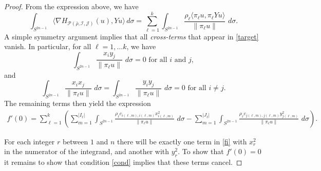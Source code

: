 \documentclass[12pt]{amsart}
\theoremstyle{definition}
\begin{document}
\begin{proof}
From the expression above, we have
\begin{equation}\label{target}
   \int_{S^{2n-1}} \langle \nabla H_{\mathcal{P}(\bar{\rho},\mathcal{I},\mathcal{J})}(u), Y u \rangle \, d\sigma = \sum_{\ell=1}^k \int_{S^{2n-1}} \frac{\rho_\ell \langle \pi_\ell u, \pi_\ell Y u \rangle }{\| \pi_\ell u\|} \, \, d \sigma.
    \end{equation}
A simple symmetry argument implies that all {\em cross-terms} that appear in \eqref{target} vanish. In particular,  for all $\ell =1, \dots k$, we have 
    \begin{equation*}
        \int_{S^{2n-1}} \frac{x_i y_j}{\|\pi_\ell u\|} \, \, d \sigma = 0\,\,\text{for all $i$ and $j$},
    \end{equation*}
    and 
    \begin{equation*}
        \int_{S^{2n-1}} \frac{x_i x_j}{\|\pi_\ell u\|} \, \, d \sigma = \int_{S^{2n-1}} \frac{y_i y_j}{\|\pi_\ell u\|} \, \, d \sigma =0\,\,\text{for all $i \neq j$}.
    \end{equation*}
The remaining terms then yield the expression
    \begin{align}\label{fi}
    f'(0)=\sum_{\ell=1}^k\left(\sum_{m=1}^{|I_{\ell}|} \int_{S^{2n-1}} \frac{ \rho_\ell c_{i(\ell, m), i(\ell, m)} x_{i(\ell, m)}^2}{\|\pi_\ell u\|} \, \, d \sigma - \sum_{m = 1}^{|J_\ell|} \int_{S^{2n-1}} \frac{ \rho_\ell c_{j(\ell, m), j(\ell, m)}y_{j(\ell, m)}^2}{\|\pi_\ell u\|} \, \, d \sigma \right).
    \end{align}
    
For each integer $r$ between $1$ and $n$ there will be exactly one term in \eqref{fi} with $x_r^2$ in the numerator of the integrand, and another with $y_r^2$.  To show  that $f'(0)=0$ it remains to show that condition \eqref{cond} implies that these terms cancel.


\end{proof}
\end{document}
